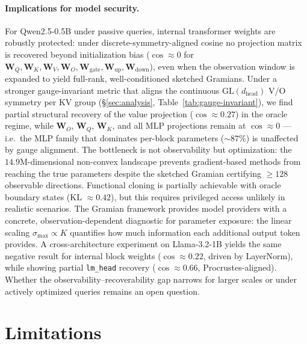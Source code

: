 \documentclass{article}
\newcommand{\bW}{\mathbf{W}}
\begin{document}
\paragraph{Implications for model security.}
For Qwen2.5-0.5B under passive queries, internal transformer weights are robustly protected: under discrete-symmetry-aligned cosine no projection matrix is recovered beyond initialization bias ($\cos \approx 0$ for $\bW_Q, \bW_K, \bW_V, \bW_O, \bW_\text{gate}, \bW_\text{up}, \bW_\text{down}$), even when the observation window is expanded to yield full-rank, well-conditioned sketched Gramians. Under a stronger gauge-invariant metric that aligns the continuous $\mathrm{GL}(d_\text{head})$ V/O symmetry per KV group (\S\ref{sec:analysis}, Table~\ref{tab:gauge-invariant}), we find partial structural recovery of the value projection ($\cos \approx 0.27$) in the oracle regime, while $\bW_O$, $\bW_Q$, $\bW_K$, and all MLP projections remain at $\cos \approx 0$ --- i.e.\ the MLP family that dominates per-block parameters ($\sim 87\%$) is unaffected by gauge alignment.  The bottleneck is not observability but optimization: the $14.9\text{M}$-dimensional non-convex landscape prevents gradient-based methods from reaching the true parameters despite the sketched Gramian certifying $\geq 128$ observable directions.  Functional cloning is partially achievable with oracle boundary states (KL $\approx 0.42$), but this requires privileged access unlikely in realistic scenarios.  The Gramian framework provides model providers with a concrete, observation-dependent diagnostic for parameter exposure: the linear scaling $\sigma_{\max} \propto K$ quantifies how much information each additional output token provides.  A cross-architecture experiment on Llama-3.2-1B yields the same negative result for internal block weights ($\cos \approx 0.22$, driven by LayerNorm), while showing partial \texttt{lm\_head} recovery ($\cos \approx 0.66$, Procrustes-aligned).  Whether the observability--recoverability gap narrows for larger scales or under actively optimized queries remains an open question.


\section{Limitations}
\label{sec:limitations}
\end{document}
